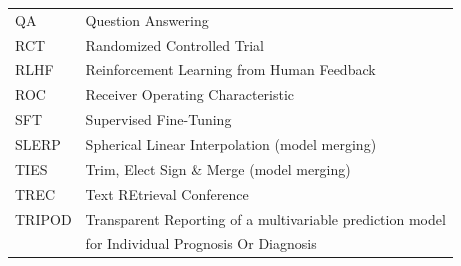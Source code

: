 \begin{tabular}{@{}p{3cm}l@{}}
QA    & Question Answering \\
RCT   & Randomized Controlled Trial \\
RLHF  & Reinforcement Learning from Human Feedback \\
ROC   & Receiver Operating Characteristic \\
SFT   & Supervised Fine-Tuning \\
SLERP & Spherical Linear Interpolation (model merging) \\
TIES  & Trim, Elect Sign \& Merge (model merging) \\
TREC  & Text REtrieval Conference \\
TRIPOD & Transparent Reporting of a multivariable prediction model \\
      & for Individual Prognosis Or Diagnosis \\
\bottomrule
\end{tabular}

\cleardoublepage